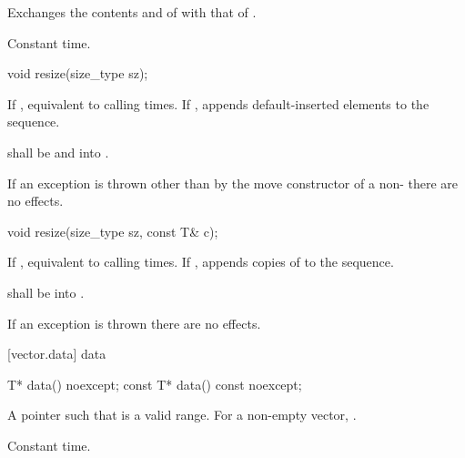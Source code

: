 \begin{itemdescr}
\pnum
\effects
Exchanges the contents and
of
with that of .

\pnum
\complexity
Constant time.
\end{itemdescr}

%
\begin{itemdecl}
void resize(size_type sz);
\end{itemdecl}

\begin{itemdescr}
\pnum
\effects If , equivalent to
calling   times. If ,
appends  default-inserted elements to the
sequence.

\pnum
\requires {} shall be
 and  into .

\pnum
\notes If an exception is thrown other than by the move constructor of a non-
 there are no effects.
\end{itemdescr}

%
\begin{itemdecl}
void resize(size_type sz, const T& c);
\end{itemdecl}

\begin{itemdescr}
\pnum
\effects If , equivalent to
calling   times. If ,
appends  copies of  to the sequence.

\pnum
\requires {} shall be
 into .

\pnum
\notes If an exception is thrown there are no effects.
\end{itemdescr}

[vector.data]{ data}

%
\begin{itemdecl}
T*         data() noexcept;
const T*   data() const noexcept;
\end{itemdecl}

\begin{itemdescr}
\pnum
\returns
A pointer such that  is a valid range. For a
non-empty vector,  \tcode{==} .

\pnum
\complexity
Constant time.
\end{itemdescr}

